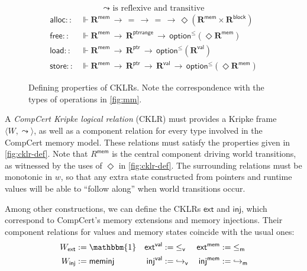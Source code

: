 \documentclass[sigplan,screen]{acmart}
\newcommand{\figsize}{\small}
\newcommand{\kw}[1]{\ensuremath{ \mathsf{#1} }}
\newcommand{\vref}{\le_\kw{v}}
\newcommand{\mext}{\le_\kw{m}}
\begin{document}
\begin{figure} %
  \figsize
  \begin{gather*}
    {\leadsto} \mbox{ is reflexive and transitive}
  \end{gather*}
  \begin{align*}
      \kw{alloc} ::
        &\Vdash \mathbf{R}^\kw{mem} \,\rightarrow\, {=} \,\rightarrow\, {=} \,\rightarrow\,
        \Diamond (\mathbf{R}^\kw{mem} \times \mathbf{R}^\kw{block})
      \\
      \kw{free} ::
        &\Vdash \mathbf{R}^\kw{mem} \,\rightarrow\, \mathbf{R}^\kw{ptrrange} \,\rightarrow\,
        \kw{option}^\le(\Diamond \mathbf{R}^\kw{mem})
      \\
      \kw{load} ::
        &\Vdash \mathbf{R}^\kw{mem} \,\rightarrow\, \mathbf{R}^\kw{ptr} \,\rightarrow\,
        \kw{option}^\le(\mathbf{R}^\kw{val})
      \\
      \kw{store} ::
        &\Vdash \mathbf{R}^\kw{mem} \,\rightarrow\, \mathbf{R}^\kw{ptr} \,\rightarrow\,
	\mathbf{R}^\kw{val} \,\rightarrow\,
        \kw{option}^\le(\Diamond \mathbf{R}^\kw{mem})
  \end{align*}
  \caption{Defining properties of CKLRs.
    Note the correspondence with
    the types of operations in \autoref{fig:mm}.}
  \label{fig:cklr-def}
\end{figure}

A \emph{CompCert Kripke logical relation} (CKLR)
must provides a Kripke frame $\langle W, {\leadsto} \rangle$,
as well as a component relation for every type involved
in the CompCert memory model.
These relations must satisfy
the properties given in \autoref{fig:cklr-def}.
Note that $R^\kw{mem}$
is the central component driving world transitions,
as witnessed by the uses of $\Diamond$ in \autoref{fig:cklr-def}.
The surrounding relations must be monotonic in $w$,
so that any extra state
constructed from pointers and runtime values
will be able to ``follow along'' when
world transitions occur.

Among other constructions,
we can define
the CKLRs $\kw{ext}$ and $\kw{inj}$,
which correspond to
CompCert's memory extensions and memory injections.
Their component relations for values and memory states
coincide with the usual ones:
\begin{align*}
  W_\kw{ext} &:= \mathbbm{1} &
  \kw{ext}^\kw{val} &:= {\vref} &
  \kw{ext}^\kw{mem} &:= {\mext} \\
  W_\kw{inj} &:= \kw{meminj} &
  \kw{inj}^\kw{val} &:= {\hookrightarrow_\kw{v}} &
  \kw{inj}^\kw{mem} &:= {\hookrightarrow_\kw{m}}
\end{align*}
\end{document}
